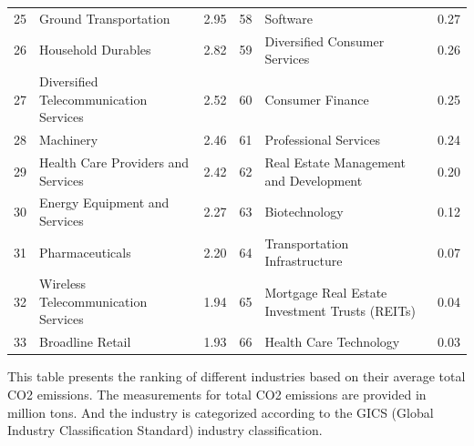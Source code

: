 \documentclass[12pt]{article}
\begin{document}
\begin{landscape}
\begin{table}[!ht]
\begin{tabular}{clcclc}
   25 &                              Ground Transportation &                2.95 &    58 &                                         Software &                0.27 \\
   26 &                                 Household Durables &                2.82 &    59 &                    Diversified Consumer Services &                0.26 \\
   27 &             Diversified Telecommunication Services &                2.52 &    60 &                                 Consumer Finance &                0.25 \\
   28 &                                          Machinery &                2.46 &    61 &                            Professional Services &                0.24 \\
   29 &                 Health Care Providers and Services &                2.42 &    62 &           Real Estate Management and Development &                0.20 \\
   30 &                      Energy Equipment and Services &                2.27 &    63 &                                    Biotechnology &                0.12 \\
   31 &                                    Pharmaceuticals &                2.20 &    64 &                    Transportation Infrastructure &                0.07 \\
   32 &                Wireless Telecommunication Services &                1.94 &    65 &   Mortgage Real Estate Investment Trusts (REITs) &                0.04 \\
   33 &                                   Broadline Retail &                1.93 &    66 &                           Health Care Technology &                0.03 \\
\bottomrule
\end{tabular}
\begin{tablenotes}
\footnotesize
\item This table presents the ranking of different industries based on their average total CO2 emissions. The measurements for total CO2 emissions are provided in million tons. And the industry is categorized according to the GICS (Global Industry Classification Standard) industry classification.
\end{tablenotes}
\end{table}
\end{landscape}
\clearpage
\end{document}
